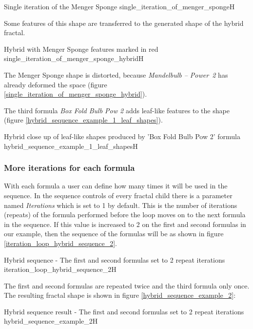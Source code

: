 {Single iteration of the Menger Sponge}
{single_iteration_of_menger_sponge}{H}

Some features of this shape are transferred to the generated shape of the hybrid fractal.

{Hybrid with Menger Sponge features marked in red}
{single_iteration_of_menger_sponge_hybrid}{H}

The Menger Sponge shape is distorted, because \emph{Mandelbulb -- Power~2} has
already deformed the space (figure \ref{single_iteration_of_menger_sponge_hybrid}).

The third formula \emph{Box Fold Bulb Pow 2} adds leaf-like features to the shape (figure \ref{hybrid_sequence_example_1_leaf_shapes}).

{Hybrid close up of leaf-like shapes produced by 'Box Fold Bulb Pow 2' formula}
{hybrid_sequence_example_1_leaf_shapes}{H}

\subsubsection{More iterations for each formula}
\label{two-iterations-per-slot}

With each formula a user can define how many times it will be used in the sequence.
In the sequence controls of every fractal child there is a parameter named \emph{Iterations} which is set to 1 by default.
This is the number of iterations (repeats) of the formula performed before the loop moves on to the next formula in the sequence. If this value is increased to 2 on the first and second formulas in our example,
then the sequence of the formulas will be as shown in figure \ref{iteration_loop_hybrid_sequence_2}.

{Hybrid sequence - The first and second formulas set to 2 repeat iterations}
{iteration_loop_hybrid_sequence_2}{H}

The first and second formulas are repeated twice and the third formula only once.
The resulting fractal shape is shown in figure \ref{hybrid_sequence_example_2}:

{Hybrid sequence result - The first and second formulas set to 2 repeat iterations}
{hybrid_sequence_example_2}{H}

